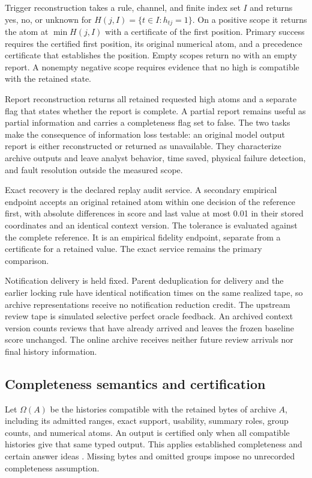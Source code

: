 \documentclass[a4paper,fleqn]{cas-dc}
\begin{document}
Trigger reconstruction takes a rule, channel, and finite index set $I$ and returns yes, no, or unknown for $H(j,I)=\{t\in I:h_{tj}=1\}$. On a positive scope it returns the atom at $\min H(j,I)$ with a certificate of the first position. Primary success requires the certified first position, its original numerical atom, and a precedence certificate that establishes the position. Empty scopes return no with an empty report. A nonempty negative scope requires evidence that no high is compatible with the retained state.

Report reconstruction returns all retained requested high atoms and a separate flag that states whether the report is complete. A partial report remains useful as partial information and carries a completeness flag set to false. The two tasks make the consequence of information loss testable: an original model output report is either reconstructed or returned as unavailable. They characterize archive outputs and leave analyst behavior, time saved, physical failure detection, and fault resolution outside the measured scope.

Exact recovery is the declared replay audit service. A secondary empirical endpoint accepts an original retained atom within one decision of the reference first, with absolute differences in score and last value at most 0.01 in their stored coordinates and an identical context version. The tolerance is evaluated against the complete reference. It is an empirical fidelity endpoint, separate from a certificate for a retained value. The exact service remains the primary comparison.

Notification delivery is held fixed. Parent deduplication for delivery and the earlier locking rule have identical notification times on the same realized tape, so archive representations receive no notification reduction credit. The upstream review tape is simulated selective perfect oracle feedback. An archived context version counts reviews that have already arrived and leaves the frozen baseline score unchanged. The online archive receives neither future review arrivals nor final history information.

\subsection{Completeness semantics and certification}

Let $\Omega(A)$ be the histories compatible with the retained bytes of archive $A$, including its admitted ranges, exact support, usability, summary roles, group counts, and numerical atoms. An output is certified only when all compatible histories give that same typed output. This applies established completeness and certain answer ideas \cite{RazniewskiNutt2011,Libkin2015}. Missing bytes and omitted groups impose no unrecorded completeness assumption.
\end{document}
